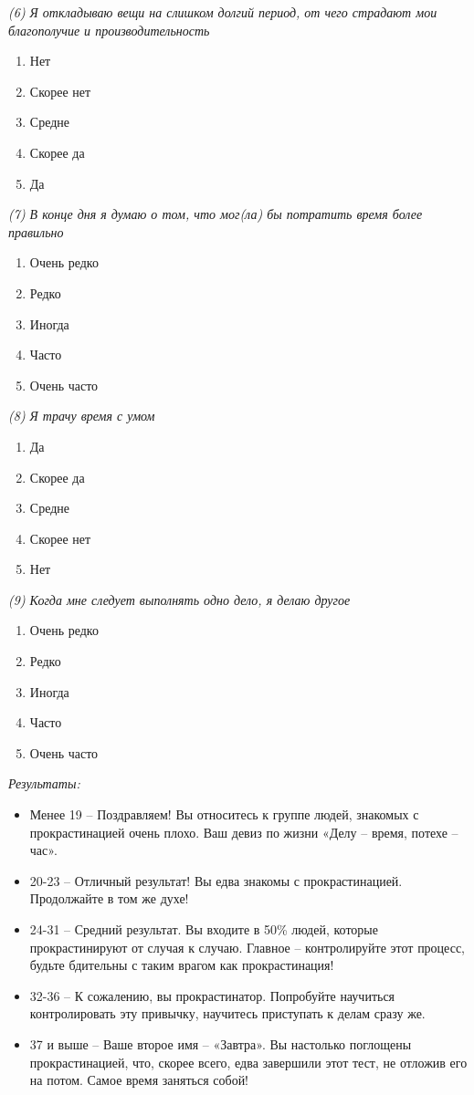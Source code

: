 \textit{(6) Я откладываю вещи на слишком долгий период, от чего страдают мои благополучие и производительность}
\begin{enumerate}
    \item Нет
    \item Скорее нет
    \item Средне
    \item Скорее да
    \item Да
\end{enumerate}

\newpage
\textit{(7) В конце дня я думаю о том, что мог(ла) бы потратить время более правильно}
\begin{enumerate}
    \item Очень редко
    \item Редко
    \item Иногда
    \item Часто
    \item Очень часто
\end{enumerate}

\textit{(8) Я трачу время с умом}
\begin{enumerate}
    \item Да
    \item Скорее да
    \item Средне
    \item Скорее нет
    \item Нет
\end{enumerate}

\textit{(9) Когда мне следует выполнять одно дело, я делаю другое}
\begin{enumerate}
    \item Очень редко
    \item Редко
    \item Иногда
    \item Часто
    \item Очень часто
\end{enumerate}


\textit{Результаты:}

\begin{itemize}
    \item Менее 19 – Поздравляем! Вы относитесь к группе людей, знакомых с прокрастинацией очень плохо. Ваш девиз по жизни «Делу – время, потехе – час».
    \item 20-23 – Отличный результат! Вы едва знакомы с прокрастинацией. Продолжайте в том же духе!
    \item 24-31 – Средний результат. Вы входите в 50\% людей, которые прокрастинируют от случая к случаю. Главное – контролируйте этот процесс, будьте бдительны с таким врагом как прокрастинация!
    \item 32-36 – К сожалению, вы прокрастинатор. Попробуйте научиться контролировать эту привычку, научитесь приступать к делам сразу же.
    \item 37 и выше – Ваше второе имя – «Завтра». Вы настолько поглощены прокрастинацией, что, скорее всего, едва завершили этот тест, не отложив его на потом. Самое время заняться собой!
\end{itemize}

